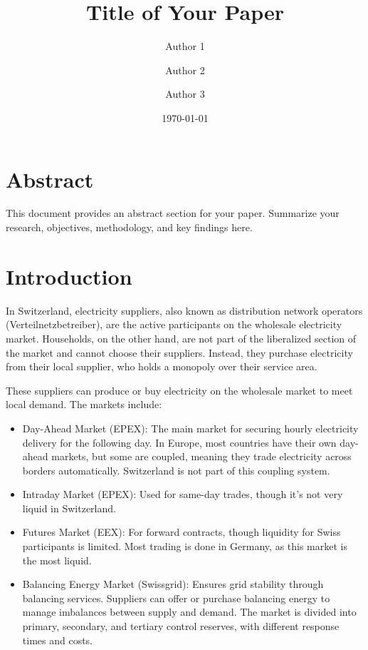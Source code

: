 \documentclass[12pt]{article}
\title{Title of Your Paper}
\author{Author 1 \and Author 2 \and Author 3}
\date{\today}
\begin{document}
\maketitle

\newpage
\tableofcontents
\newpage

\section{Abstract}
This document provides an abstract section for your paper. Summarize your research, objectives, methodology, and key findings here.

\newpage

\section{Introduction}
In Switzerland, electricity suppliers, also known as distribution network
operators (Verteilnetzbetreiber), are the active participants on the wholesale
electricity market. Households, on the other hand, are not part of the
liberalized section of the market and cannot choose their suppliers. Instead,
they purchase electricity from their local supplier, who holds a monopoly over
their service area.

These suppliers can produce or buy electricity on the wholesale market to meet local
demand. The markets include:

\begin{itemize}
\item Day-Ahead Market (EPEX): The main market for securing hourly electricity
delivery for the following day. In Europe, most countries have their own
day-ahead markets, but some are coupled, meaning they trade electricity across
borders automatically. Switzerland is not part of this coupling system.
\item Intraday Market (EPEX): Used for same-day trades, though it's not very liquid
in Switzerland.
\item Futures Market (EEX): For forward contracts, though liquidity for Swiss
participants is limited. Most trading is done in Germany, as this market is 
the most liquid. 
\item Balancing Energy Market (Swissgrid): Ensures grid stability through balancing
services. Suppliers can offer or purchase balancing energy to manage imbalances
between supply and demand. The market is divided into primary, secondary, and
tertiary control reserves, with different response times and costs.
\end{itemize}
\end{document}
